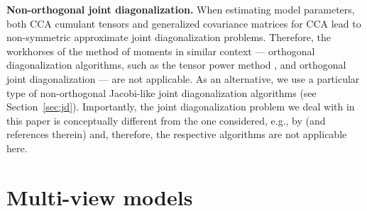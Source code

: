 \documentclass{article}
\newcommand{\ppp}{\textbf}
\begin{document}
\ppp{Non-orthogonal joint diagonalization.} When estimating model parameters, both CCA cumulant tensors and generalized covariance matrices for CCA lead to non-symmetric approximate joint diagonalization problems. Therefore, the workhorses of the method of moments in similar context --- orthogonal diagonalization algorithms, such as the tensor power method \cite{AnaEtAl2014},  and orthogonal joint diagonalization \citep{BunEtAl1993,CarSou1996} --- are not applicable. As an alternative, we use a particular type of non-orthogonal Jacobi-like joint diagonalization algorithms (see Section~\ref{sec:jd}). Importantly, the joint diagonalization problem we deal with in this paper is conceptually different from the one considered, e.g., by \citet{KulEtAl2015} (and references therein) and, therefore, the respective algorithms are not applicable here.









\section{Multi-view models}
\end{document}
